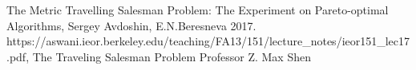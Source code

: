 \documentclass[10pt,a4paper]{article}
\begin{document}




\normalsize
\begin{thebibliography}{9}

The Metric Travelling Salesman Problem:
The Experiment on Pareto-optimal
Algorithms,
Sergey Avdoshin, E.N.Beresneva
2017.
https://aswani.ieor.berkeley.edu/teaching/FA13/151/lecture\_notes/ieor151\_lec17.pdf,
The Traveling Salesman Problem
Professor Z. Max Shen

\end{thebibliography}
\end{document}
